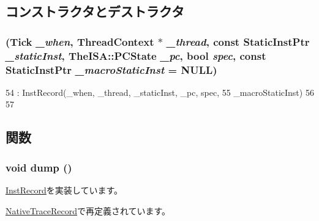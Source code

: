 \subsection{コンストラクタとデストラクタ}
\hypertarget{classTrace_1_1ExeTracerRecord_a844c9c850d68ee8d85ea92d32d0adab7}{
\subsubsection[{ExeTracerRecord}]{ ({\bf Tick} {\em \_\-when}, \/  {\bf ThreadContext} $\ast$ {\em \_\-thread}, \/  const {\bf StaticInstPtr} {\em \_\-staticInst}, \/  TheISA::PCState {\em \_\-pc}, \/  bool {\em spec}, \/  const {\bf StaticInstPtr} {\em \_\-macroStaticInst} = {\ttfamily NULL})}}
\label{classTrace_1_1ExeTracerRecord_a844c9c850d68ee8d85ea92d32d0adab7}



\begin{DoxyCode}
54         : InstRecord(_when, _thread, _staticInst, _pc, spec,
55                 _macroStaticInst)
56     {
57     }
\end{DoxyCode}


\subsection{関数}
\hypertarget{classTrace_1_1ExeTracerRecord_accd2600060dbaee3a3b41aed4034c63c}{
\subsubsection[{dump}]{\setlength{\rightskip}{0pt plus 5cm}void dump ()}}
\label{classTrace_1_1ExeTracerRecord_accd2600060dbaee3a3b41aed4034c63c}


\hyperlink{classTrace_1_1InstRecord_abf1ad25f5e8a680b74ae28575b1f0539}{InstRecord}を実装しています。

\hyperlink{classTrace_1_1NativeTraceRecord_accd2600060dbaee3a3b41aed4034c63c}{NativeTraceRecord}で再定義されています。


